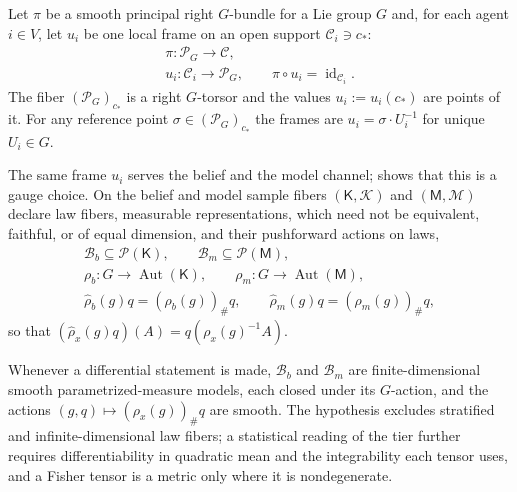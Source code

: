 Let $\pi$ be a smooth principal right $G$-bundle for a Lie group $G$ and, for each agent $i\in V$,
let $u_i$ be one local frame on an open support $\mathcal C_i\ni c_*$:
\begin{gather}
\pi:\mathscr P_G\longrightarrow\mathcal C,
\label{eq:geo-principal-bundle}\\
u_i:\mathcal C_i\longrightarrow\mathscr P_G,
\qquad
\pi\circ u_i=\operatorname{id}_{\mathcal C_i}.
\label{eq:geo-frame-sections}
\end{gather}
The fiber $(\mathscr P_G)_{c_*}$ is a right $G$-torsor and the values $u_i:=u_i(c_*)$ are points of
it. For any reference point $\sigma\in(\mathscr P_G)_{c_*}$ the frames are
$u_i=\sigma\cdot U_i^{-1}$ for unique $U_i\in G$.

The same frame $u_i$ serves the belief and the model channel; 
shows that this is a gauge choice. On the belief and model sample fibers $(\mathsf K,\mathscr K)$ and
$(\mathsf M,\mathscr M)$ declare law fibers, measurable representations, which need not be equivalent,
faithful, or of equal dimension, and their pushforward actions on laws,
\begin{gather}
\mathcal B_b\subseteq\mathcal P(\mathsf K),
\qquad
\mathcal B_m\subseteq\mathcal P(\mathsf M),
\label{eq:geo-law-fibers}\\
\rho_b:G\longrightarrow\operatorname{Aut}(\mathsf K),
\qquad
\rho_m:G\longrightarrow\operatorname{Aut}(\mathsf M),
\label{eq:geo-representations}\\
\widehat\rho_b(g)q=(\rho_b(g))_\#q,
\qquad
\widehat\rho_m(g)q=(\rho_m(g))_\#q,
\label{eq:geo-pushforward-actions}
\end{gather}
so that $(\widehat\rho_x(g)q)(A)=q(\rho_x(g)^{-1}A)$.

Whenever a differential statement is made, $\mathcal B_b$ and $\mathcal B_m$ are finite-dimensional
smooth parametrized-measure models, each closed under its $G$-action, and the actions
$(g,q)\mapsto(\rho_x(g))_\#q$\label{eq:geo-smooth-actions} are smooth. The hypothesis excludes
stratified and infinite-dimensional law fibers; a statistical reading of the tier further requires
differentiability in quadratic mean and the integrability each tensor uses, and a Fisher tensor is a
metric only where it is nondegenerate.

